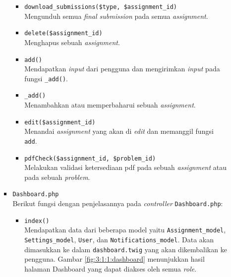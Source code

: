 \documentclass[a4paper,twoside]{article}
\begin{document}
\begin{enumerate}
\begin{itemize}
\begin{itemize}
\begin{itemize}
				                  \item \verb|download_submissions($type, $assignment_id)| \\
				                        Mengunduh semua \textit{final submission} pada semua \textit{assignment}.
				                  \item \verb|delete($assignment_id)| \\
				                        Menghapus sebuah \textit{assignment}.
				                  \item \verb|add()| \\
				                        Mendapatkan \textit{input} dari pengguna dan mengirimkan \textit{input} pada fungsi \verb|_add()|.
				                  \item \verb|_add()| \\
				                        Menambahkan atau memperbaharui sebuah \textit{assignment}.
				                  \item \verb|edit($assignment_id)| \\
				                        Menandai \textit{assignment} yang akan di \textit{edit} dan memanggil fungsi \verb|add|.
				                  \item \verb|pdfCheck($assignment_id, $problem_id)| \\
				                        Melakukan validasi ketersediaan pdf pada sebuah \textit{assignment} atau pada sebuah \textit{problem}.
			                  \end{itemize}

			            \item \verb|Dashboard.php| \\
			                  Berikut fungsi dengan penjelasannya pada \textit{controller} \verb|Dashboard.php|:

			                  \begin{itemize}
				                  \item \verb|index()| \\
				                        Mendapatkan data dari beberapa model yaitu \verb|Assignment_model|, \verb|Settings_model|, \verb|User|, dan \verb|Notifications_model|. Data akan dimasukkan ke dalam \verb|dashboard.twig| yang akan dikembalikan ke pengguna. Gambar \ref{fig:3:1:1:dashboard} menunjukkan hasil halaman Dashboard yang dapat diakses oleh semua \textit{role}.


\end{itemize}
\end{itemize}
\end{itemize}
\end{enumerate}
\end{document}
